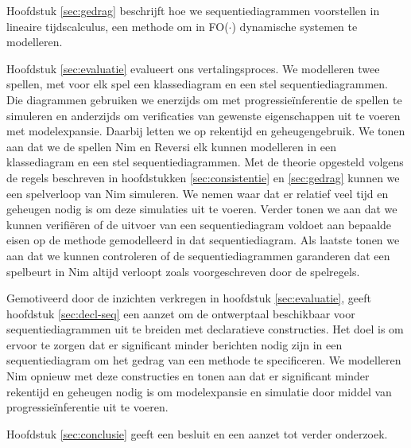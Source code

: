 \sloppy Hoofdstuk \ref{sec:gedrag} beschrijft hoe we sequentiediagrammen voorstellen in lineaire tijdscalculus\cite{BogaertsBart2014Sdsu}, een methode om in FO($\cdot$) dynamische systemen te modelleren.

Hoofdstuk \ref{sec:evaluatie} evalueert ons vertalingsproces. We modelleren twee spellen, met voor elk spel een klassediagram en een stel sequentiediagrammen. Die diagrammen gebruiken we enerzijds om met progressie\"inferentie de spellen te simuleren en anderzijds om verificaties van gewenste eigenschappen uit te voeren met modelexpansie. Daarbij letten we op rekentijd en geheugengebruik. We tonen aan dat we de spellen Nim en Reversi elk kunnen modelleren in een klassediagram en een stel sequentiediagrammen. Met de theorie opgesteld volgens de regels beschreven in hoofdstukken \ref{sec:consistentie} en \ref{sec:gedrag} kunnen we een spelverloop van Nim simuleren. We nemen waar dat er relatief veel tijd en geheugen nodig is om deze simulaties uit te voeren. Verder tonen we aan dat we kunnen verifi\"eren of de uitvoer van een sequentiediagram voldoet aan bepaalde eisen op de methode gemodelleerd in dat sequentiediagram. Als laatste tonen we aan dat we kunnen controleren of de sequentiediagrammen garanderen dat een spelbeurt in Nim altijd verloopt zoals voorgeschreven door de spelregels.

Gemotiveerd door de inzichten verkregen in hoofdstuk \ref{sec:evaluatie}, geeft hoofdstuk \ref{sec:decl-seq} een aanzet om de ontwerptaal beschikbaar voor sequentiediagrammen uit te breiden met declaratieve constructies. Het doel is om ervoor te zorgen dat er significant minder berichten nodig zijn in een sequentiediagram om het gedrag van een methode te specificeren. We modelleren Nim opnieuw met deze constructies en tonen aan dat er significant minder rekentijd en geheugen nodig is om modelexpansie en simulatie door middel van progressie\"inferentie uit te voeren.

Hoofdstuk \ref{sec:conclusie} geeft een besluit en een aanzet tot verder onderzoek.